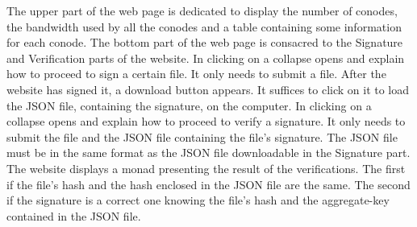 \documentclass[11pt, a4paper, twoside, openright, openany]{article}
\begin{document}
The upper part of the web page is dedicated to display the number of conodes, the bandwidth used by all the conodes and
a table containing some information for each conode.
\newline \newline
The bottom part of the web page is consacred to the Signature and Verification parts of the website.
\newline \newline
In clicking on  a collapse opens and explain how to proceed to sign a certain file.
It only needs to submit a file. After the website has signed it, a download button appears.
It suffices to click on it to load the JSON file, containing the signature, on the computer.
\newline \newline
In clicking on  a collapse opens and explain how to proceed to verify a signature.
It only needs to submit the file and the JSON file containing the file's signature.
The JSON file must be in the same format as the JSON file downloadable in the Signature part.
\newline
The website displays a monad presenting the result of the verifications. The first if the file's hash and the hash enclosed in the JSON file are the same.
The second if the signature is a correct one knowing the file's hash and the aggregate-key contained in the JSON file.
\bigbreak

\clearpage
\begingroup
\let\cleardoublepage\clearpage


\endgroup
\end{document}
